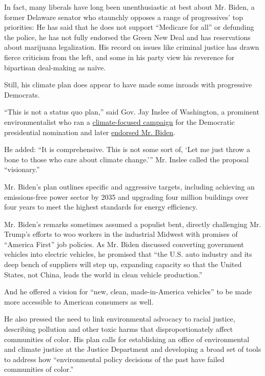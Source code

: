 In fact, many liberals have long been unenthusiastic at best about Mr.
Biden, a former Delaware senator who staunchly opposes a range of
progressives' top priorities: He has said that he does not support
``Medicare for all'' or defunding the police, he has not fully endorsed
the Green New Deal and has reservations about marijuana legalization.
His record on issues like criminal justice has drawn fierce criticism
from the left, and some in his party view his reverence for bipartisan
deal-making as naïve.

Still, his climate plan does appear to have made some inroads with
progressive Democrats.

``This is not a status quo plan,'' said Gov. Jay Inslee of Washington, a
prominent environmentalist who ran a
\href{https://www.nytimes.com/2019/08/21/us/politics/jay-inslee-2020-campaign.html}{climate-focused
campaign} for the Democratic presidential nomination and later
\href{https://www.nytimes.com/2020/04/22/us/politics/jay-inslee-endorses-biden.html}{endorsed
Mr. Biden}.

He added: ``It is comprehensive. This is not some sort of, `Let me just
throw a bone to those who care about climate change.''' Mr. Inslee
called the proposal ``visionary.''

Mr. Biden's plan outlines specific and aggressive targets, including
achieving an emissions-free power sector by 2035 and upgrading four
million buildings over four years to meet the highest standards for
energy efficiency.

Mr. Biden's remarks sometimes assumed a populist bent, directly
challenging Mr. Trump's efforts to woo workers in the industrial Midwest
with promises of ``America First'' job policies. As Mr. Biden discussed
converting government vehicles into electric vehicles, he promised that
``the U.S. auto industry and its deep bench of suppliers will step up,
expanding capacity so that the United States, not China, leads the world
in clean vehicle production.''

And he offered a vision for ``new, clean, made-in-America vehicles'' to
be made more accessible to American consumers as well.

He also pressed the need to link environmental advocacy to racial
justice, describing pollution and other toxic harms that
disproportionately affect communities of color. His plan calls for
establishing an office of environmental and climate justice at the
Justice Department and developing a broad set of tools to address how
``environmental policy decisions of the past have failed communities of
color.''

